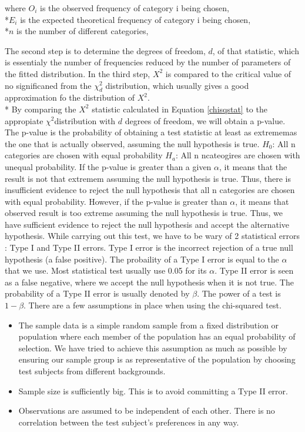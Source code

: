 \documentclass[oneside,12pt]{report}
\begin{document}
where $O_{i}$ is the observed frequency of category i being chosen,
\\*$E_{i}$ is the expected theoretical frequency of category i being chosen,
\\*$n$ is the number of different categories,

\vskip3pt The second step is to determine the degrees of freedom, $d$, of that statistic, which is essentialy the number of frequencies reduced by the number of parameters of the fitted distribution. In the third step, $X^2$ is compared to the critical value of no significaned from the $\chi_{d}^{2}$ distribution, which usually gives a good approximation fo the distribution of $X^2$.
\\* By comparing the $X^2$ statistic calculated in Equation \eqref{chisqstat} to the appropiate $\chi^{2}$distribution with $d$ degrees of freedom, we will obtain a p-value. The p-value is the probability of obtaining a test statistic at least as extrememas the one that is actually observed, assuming the null hypothesis is true.
\vskip6pt $H_0$: All n categories are chosen with equal probability
\vskip3pt $H_a$: All n ncateogires are chosen with unequal probability.
\vskip6pt If the p-value is greater than a given $\alpha$, it means that the result is not that extremem assuming the null hypothesis is true. Thus, there is insufficient evidence to reject the null hypothesis that all n categories are chosen with equal probability. However, if the p-value is greater than $\alpha$, it means that observed result is too extreme assuming the null hypothesis is true. Thus, we have sufficient evidence to reject the null hypothesis and accept the alternative hypothesis.
\vskip6pt
While carrying out this test, we have to be wary of 2 statistical errors : Type I and Type II errors. Type I error is the incorrect rejection of a true null hypothesis (a false positive). The probaility of a Type I error is equal to the $\alpha$ that we use. Most statistical test usually use 0.05 for its $\alpha$. Type II error is seen as a false negative, where we accept the null hypothesis when it is not true. The probability of a Type II error is usually denoted by $\beta$. The power of a test is $1-\beta$.
\vskip6pt
There are a few assumptions in place when using the chi-squared test.
\begin{itemize}
\item The sample data is a simple random sample from a fixed distribution or population where each member of the population has an equal probability of selection. We have tried to achieve this assumption as much as possible by ensuring our sample group is as representative of the population by choosing test subjects from different backgrounds.
\item Sample size is sufficiently big. This is to avoid committing a Type II error.
\item Observations are assumed to be independent of each other. There is no correlation between the test subject's preferences in any way.


\end{itemize}
\end{document}
